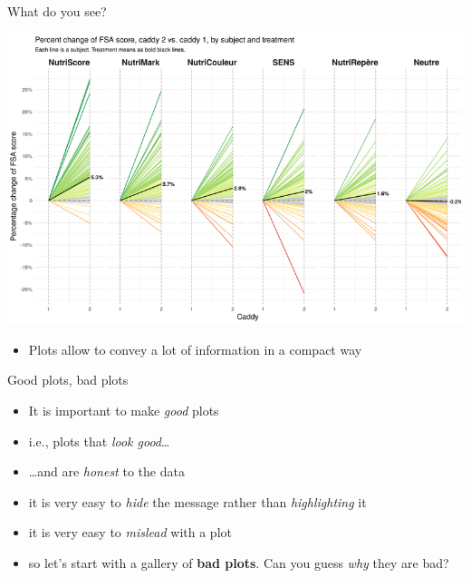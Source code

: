 \documentclass[
  ignorenonframetext,
]{beamer}
\providecommand{\tightlist}{%
  \setlength{\itemsep}{0pt}\setlength{\parskip}{0pt}}
\begin{document}
\begin{frame}{What do you see?}
\protect\hypertarget{what-do-you-see}{}

\includegraphics{fig/SlopePlot_pourcentage.png}

\begin{itemize}
\tightlist
\item
  Plots allow to convey a lot of information in a compact way
\end{itemize}

\end{frame}

\begin{frame}{Good plots, bad plots}
\protect\hypertarget{good-plots-bad-plots}{}

\begin{itemize}
\item
  It is important to make \emph{good} plots
\item
  i.e., plots that \emph{look good}\ldots{}
\item
  \ldots and are \emph{honest} to the data
\item
  it is very easy to \emph{hide} the message rather than
  \emph{highlighting} it
\item
  it is very easy to \emph{mislead} with a plot
\item
  so let's start with a gallery of \textbf{bad plots}. Can you guess
  \emph{why} they are bad?
\end{itemize}

\end{frame}
\end{document}
